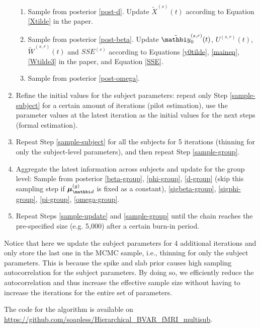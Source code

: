 \documentclass[12pt,titlepage,fleqn]{article}
\newcommand{\1}{{\bm 1}}
\newcommand{\vy}{\mathbi y}
\newcommand{\vd}{\mathbi d}
\newcommand{\vmu}{\boldsymbol{\mu}}
\newcommand{\g}{^{(g)}}
\newcommand{\s}{^{(s)}}
\newcommand{\sr}{^{(s,r)}}
\begin{document}
\begin{enumerate}
\begin{enumerate}
	  \item Sample from posterior \eqref{post-d}. Update $\tilde{X}\s(t)$ according to Equation \eqref{Xtilde} in the paper.
	   \item Sample from posterior \eqref{post-beta}. Update $\tilde{\vy}_0\sr(t)$, $U\sr(t)$, $\tilde{W}\sr(t)$ and $SSE\s$ according to Equations \eqref{y0tilde}, \eqref{maineq}, %
	   \eqref{Wtilde3} in the paper, and Equation \eqref{SSE}.
	   \item Sample from posterior \eqref{post-omega}. 
	\end{enumerate}  
 \item \label{sample-pilot}
Refine the initial values for the subject parameters: repeat only Step \ref{sample-subject} for a certain amount of iterations (pilot estimation), use the parameter values at the latest iteration as the initial values for the next steps (formal estimation). 
 \item \label{sample-update}
Repeat Step \ref{sample-subject} for all the subjects for 5 iterations (thinning for only the subject-level parameters), and then repeat Step \ref{sample-group}.
  \item \label{sample-group}
Aggregate the latest information across subjects and update for the group level: 
Sample from posterior \eqref{beta-group}, \eqref{phi-group}, \eqref{d-group} (skip this sampling step if $\vmu_{\vd}\g$ is fixed as a constant), 
     \eqref{sigbeta-group}, \eqref{sigphi-group}, \eqref{pi-group}, \eqref{omega-group}.
 \item \label{sample-repeat}
Repeat Steps \ref{sample-update} and \ref{sample-group} until the chain reaches the pre-specified size (e.g. 5,000) after a certain burn-in period.   
\end{enumerate}


Notice that here we update the subject parameters for 4 additional iterations and only store the last one in the MCMC sample, i.e., thinning for only the subject parameters. This is because the spike and slab prior causes high sampling autocorrelation for the subject parameters. By doing so, we efficiently reduce the autocorrelation and thus increase the effective sample size without having to increase the iterations for the entire set of parameters. 


{\color{violet} The code for the algorithm is available on \url{https://github.com/soapless/Hierarchical_BVAR_fMRI_multisub}. }
\end{document}
